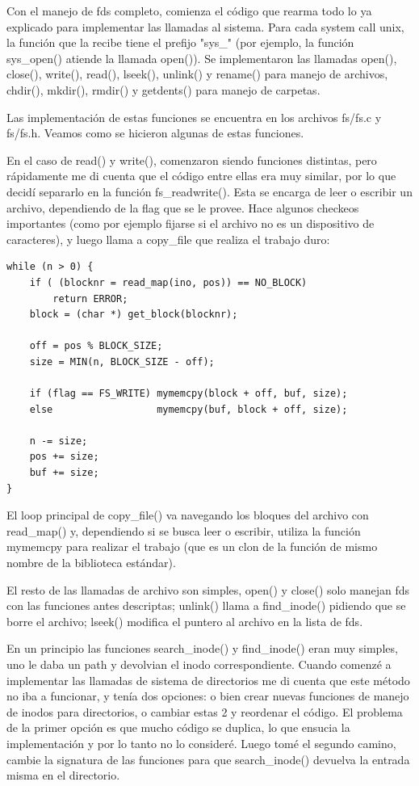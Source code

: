Con el manejo de fds completo, comienza el código que rearma todo lo ya
explicado para implementar las llamadas al sistema. Para cada system call unix,
la función que la recibe tiene el prefijo "sys\_" (por ejemplo, la función
sys\_open() atiende la llamada open()). Se implementaron las llamadas open(),
close(), write(), read(), lseek(), unlink() y rename() para manejo de archivos,
chdir(), mkdir(), rmdir() y getdents() para manejo de carpetas.

Las implementación de estas funciones se encuentra en los archivos fs/fs.c y
fs/fs.h. Veamos como se hicieron algunas de estas funciones.

En el caso de read() y write(), comenzaron siendo funciones distintas, pero
rápidamente me di cuenta que el código entre ellas era muy similar, por lo que
decidí separarlo en la función fs\_readwrite(). Esta se encarga de leer o
escribir un archivo, dependiendo de la flag que se le provee. Hace algunos
checkeos importantes (como por ejemplo fijarse si el archivo no es un
dispositivo de caracteres), y luego llama a copy\_file que realiza el trabajo
duro:

\begin{verbatim}
while (n > 0) {
    if ( (blocknr = read_map(ino, pos)) == NO_BLOCK)
        return ERROR;
    block = (char *) get_block(blocknr);

    off = pos % BLOCK_SIZE;
    size = MIN(n, BLOCK_SIZE - off);

    if (flag == FS_WRITE) mymemcpy(block + off, buf, size);
    else                  mymemcpy(buf, block + off, size);

    n -= size;
    pos += size;
    buf += size;
}
\end{verbatim}

El loop principal de copy\_file() va navegando los bloques del archivo con
read\_map() y, dependiendo si se busca leer o escribir, utiliza la función
mymemcpy para realizar el trabajo (que es un clon de la función de mismo nombre
de la biblioteca estándar).

El resto de las llamadas de archivo son simples, open() y close() solo manejan
fds con las funciones antes descriptas; unlink() llama a find\_inode() pidiendo
que se borre el archivo; lseek() modifica el puntero al archivo en la lista de 
fds.

En un principio las funciones search\_inode() y find\_inode() eran muy simples,
uno le daba un path y devolvian el inodo correspondiente. Cuando comenzé a
implementar las llamadas de sistema de directorios me di cuenta que
este método no iba a funcionar, y tenía dos opciones: o bien crear nuevas
funciones de manejo de inodos para directorios, o cambiar estas 2 y reordenar el
código. El problema de la primer opción es que mucho código se duplica, lo que
ensucia la implementación y por lo tanto no lo consideré. Luego tomé el segundo
camino, cambie la signatura de las funciones para que search\_inode() devuelva
la entrada misma en el directorio.

